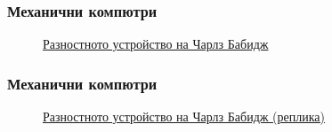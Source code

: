 \documentclass[ignorenonframetext, hyperref=unicode]{beamer}
\begin{document}
\begin{frame}
\frametitle{Механични компютри}
\begin{figure}[h]
\center
{}
\caption{\href{http://en.wikipedia.org/wiki/Difference_engine}{Разностното устройство на Чарлз Бабидж}}
\end{figure}
\end{frame}

\begin{frame}
\frametitle{Механични компютри}
\begin{figure}[h]
\center
{}
\caption{\href{http://en.wikipedia.org/wiki/Difference_engine}{Разностното устройство на Чарлз Бабидж (реплика)}}
\end{figure}
\end{frame}
\end{document}
